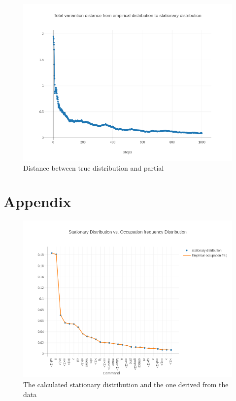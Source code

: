 \documentclass[10pt]{article}
\begin{document}
\begin{figure}[!htb]
  \centering
  \includegraphics[scale=.45]{../pictures/mixing-time-analysis.png}
  \caption{Distance between true distribution and partial}
\end{figure}

\clearpage

\section{Appendix}

\begin{figure}[!htb]
  \centering
  \includegraphics[scale=.50]{../pictures/stat-dist-and-empirical-occ-freq-dist.png}
  \caption{The calculated stationary distribution and the one derived from the data}
\end{figure}
\end{document}
